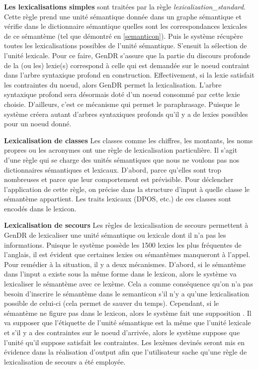 \textbf{Les lexicalisations simples}
sont traitées par la règle \emph{lexicalization\_standard}. Cette règle prend une unité sémantique donnée dans un graphe sémantique et vérifie dans le dictionnaire sémantique quelles sont les correspondances lexicales de ce sémantème (tel que démontré en \ref{semanticon}). Puis le système récupère toutes les lexicalisations possibles de l'unité sémantique. S'ensuit la sélection de l'unité lexicale. Pour ce faire, GenDR s'assure que la partie du discours profonde de la (ou les) lexie(s) correspond à celle qui est demandée sur le noeud contraint dans l'arbre syntaxique profond en construction. Effectivement, si la lexie satisfait les contraintes du noeud, alors GenDR permet la lexicalisation. L'arbre syntaxique profond sera désormais doté d'un noeud consommé par cette lexie choisie. D'ailleurs, c'est ce mécanisme qui permet le paraphrasage. Puisque le système créera autant d'arbres syntaxiques profonds qu'il y a de lexies possibles pour un noeud donné. 

\textbf{Lexicalisation de classes}
Les classes comme les chiffres, les montants, les noms propres ou les acronymes ont une règle de lexicalisation particulière. Il s'agit d'une règle qui se charge des unités sémantiques que nous ne voulons pas nos dictionnaires sémantiques et lexicaux. D'abord, parce qu'elles sont trop nombreuses et parce que leur comportement est prévisible. Pour déclencher l'application de cette règle, on précise dans la structure d'input à quelle classe le sémantème appartient. Les traits lexicaux (DPOS, etc.) de ces classes sont encodés dans le lexicon.

\textbf{Lexicalisation de secours}
Les règles de lexicalisation de secours permettent à GenDR de lexicaliser une unité sémantique ou lexicale dont il n'a pas les informations. Puisque le système possède les 1500 lexies les plus fréquentes de l'anglais, il est évident que certaines lexies ou sémantèmes manqueront à l'appel. Pour remédier à la situation, il y a deux mécanismes. D'abord, si le sémantème dans l'input a existe sous la même forme dans le lexicon, alors le système va lexicaliser le sémantème avec ce lexème. Cela a comme conséquence qu'on n'a pas besoin d'inscrire le sémantème dans le semanticon s'il n'y a qu'une lexicalisation possible de celui-ci (cela permet de sauver du temps). Cependant, si le sémantème ne figure pas dans le lexicon, alors le système fait une supposition . Il va supposer que l'étiquette de l'unité sémantique est la même que l'unité lexicale et s'il y a des contraintes sur le noeud d'arrivée, alors le système suppose que l'unité qu'il suppose satisfait les contraintes. Les lexèmes devinés seront mis en évidence dans la réalisation d'output afin que l'utilisateur sache qu'une règle de lexicalisation de secours a été employée.
	
